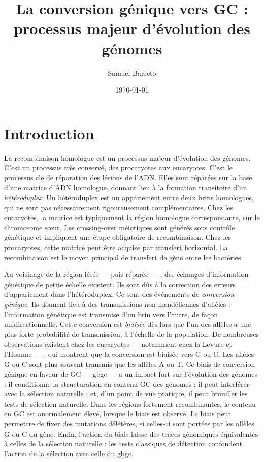 \documentclass[11pt]{scrartcl}
\author{Samuel Barreto}
\date{\today}
\title{La conversion génique vers GC : processus majeur d'évolution des génomes}
\begin{document}


\section{Introduction}
\label{sec:orgheadline1}

La recombinaison homologue est un processus majeur d'évolution des génomes.
C'est un processus très conservé, des procaryotes aux eucaryotes. C'est le
processus clé de réparation des lésions de l'ADN. Elles sont réparées sur la
base d'une matrice d'ADN homologue, donnant lieu à la formation transitoire d'un
\emph{hétéroduplex}. Un hétéroduplex est un appariement entre deux brins homologues,
qui ne sont pas nécessairement rigoureusement complémentaires. Chez les
eucaryotes, la matrice est typiquement la région homologue correspondante, sur
le chromosome sœur. Les crossing-over méiotiques sont générés sous contrôle
génétique et impliquent une étape obligatoire de recombinaison. Chez les
procaryotes, cette matrice peut être acquise par transfert horizontal. La
recombinaison est le moyen principal de transfert de gène entre les bactéries.

Au voisinage de la région lésée --- puis réparée --- , des échanges
d'information génétique de petite échelle existent. Ils sont dûs à la correction
des erreurs d'appariement dans l'hétéroduplex. Ce sont des événements de
\emph{conversion génique}. Ils donnent lieu à des transmissions non-mendéliennes
d'allèles : l'information génétique est transmise d'un brin vers l'autre, de
façon unidirectionnelle. Cette conversion est \emph{biaisée} dès lors que l'un des
allèles a une plus forte probabilité de transmission, à l'échelle de la
population. De nombreuses observations existent chez les eucaryotes ---
notamment chez la Levure et l'Homme --- , qui montrent que la conversion est
biaisée vers G ou C. Les allèles G ou C sont plus souvent transmis que les
allèles A ou T. Ce biais de conversion génique en faveur de GC --- \ac{gbgc} ---
a un impact fort sur l'évolution des génomes : il conditionne la structuration
en contenu GC des génomes ; il peut interférer avec la sélection naturelle ; et,
d'un point de vue pratique, il peut brouiller les tests de sélection naturelle.
Dans les régions fortement recombinantes, le contenu en GC est anormalement
élevé, lorsque le biais est observé. Le biais peut permettre de fixer des
mutations délétères, si celles-ci sont portées par les allèles G ou C du gène.
Enfin, l'action du biais laisse des traces génomiques équivalentes à celles de
la sélection naturelle : les tests classiques de détection confondent l'action
de la sélection avec celle du \ac{gbgc}.
\end{document}
